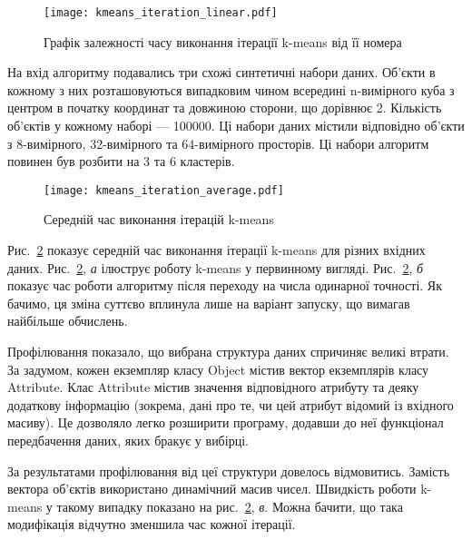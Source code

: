                 \begin{figure}
                    \centering
                    \texttt{[image: kmeans\_iteration\_linear.pdf]}
                    \caption{Графік залежності часу виконання ітерації k-means від її номера}\label{fig:kmeans_linear}
                \end{figure}
                
                На вхід алгоритму подавались три схожі синтетичні набори даних. Об’єкти в кожному з них розташовуються випадковим чином всередині n-вимірного куба з центром в початку координат та довжиною сторони, що дорівнює 2. Кількість об’єктів у кожному наборі --- 100000. Ці набори даних містили відповідно об’єкти з 8-вимірного, 32-вимірного та 64-вимірного просторів. Ці набори алгоритм повинен був розбити на 3 та 6 кластерів.
                
                \begin{figure}
                    \centering
                    \texttt{[image: kmeans\_iteration\_average.pdf]}
                    \caption{Середній час виконання ітерацій k-means}\label{fig:kmeans_average}
                \end{figure}
                
                Рис.~\ref{fig:kmeans_average} показує середній час виконання ітерації k-means для різних вхідних даних. Рис.~\ref{fig:kmeans_average}, \emph{а} ілюструє роботу k-means у первинному вигляді. Рис.~\ref{fig:kmeans_average}, \emph{б} показує час роботи алгоритму після переходу на числа одинарної точності. Як бачимо, ця зміна суттєво вплинула лише на варіант запуску, що вимагав найбільше обчислень.
                
                Профілювання показало, що вибрана структура даних спричиняє великі втрати. За задумом, кожен екземпляр класу Object містив вектор екземплярів класу Attribute. Клас Attribute містив значення відповідного атрибуту та деяку додаткову інформацію (зокрема, дані про те, чи цей атрибут відомий із вхідного масиву). Це дозволяло легко розширити програму, додавши до неї функціонал передбачення даних, яких бракує у вибірці.
                
                За результатами профілювання від цеї структури довелось відмовитись. Замість вектора об’єктів використано динамічний масив чисел. Швидкість роботи k-means у такому випадку показано на рис.~\ref{fig:kmeans_average}, \emph{в}. Можна бачити, що така модифікація відчутно  зменшила час кожної ітерації.
                
